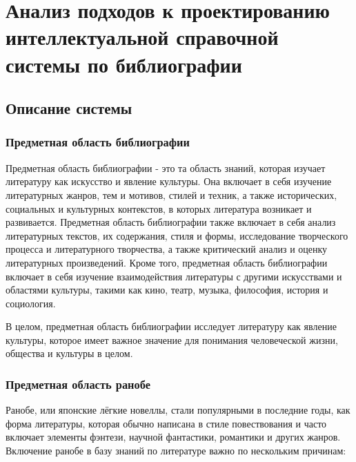 \section{Анализ подходов к проектированию интеллектуальной справочной системы по библиографии}
\label{sec:analysis}

\subsection{Описание системы}

\subsubsection{Предметная область библиографии}

Предметная область библиографии - это та область знаний, которая изучает литературу как искусство и явление культуры. Она включает в себя изучение литературных жанров, тем и мотивов, стилей и техник, а также исторических, социальных и культурных контекстов, в которых литература возникает и развивается. Предметная область библиографии также включает в себя анализ литературных текстов, их содержания, стиля и формы, исследование творческого процесса и литературного творчества, а также критический анализ и оценку литературных произведений. Кроме того, предметная область библиографии включает в себя изучение взаимодействия литературы с другими искусствами и областями культуры, такими как кино, театр, музыка, философия, история и социология.

В целом, предметная область библиографии исследует литературу как явление культуры, которое имеет важное значение для понимания человеческой жизни, общества и культуры в целом.

\subsubsection{Предметная область ранобе}

Ранобе, или японские лёгкие новеллы, стали популярными в последние годы, как форма литературы, которая обычно написана в стиле повествования и часто включает элементы фэнтези, научной фантастики, романтики и других жанров. Включение ранобе в базу знаний по литературе важно по нескольким причинам:

